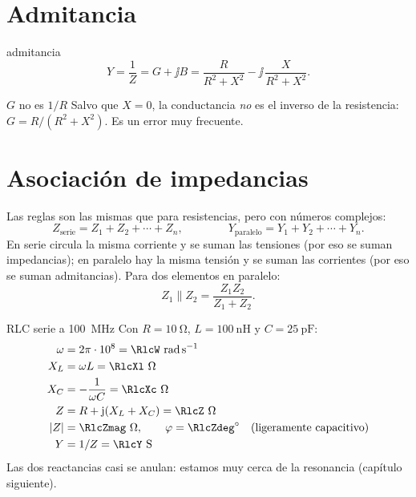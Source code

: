 \section{Admitancia}

\begin{definicion}{admitancia}
\begin{equation}
  Y = \frac{1}{Z} = G + \jj B = \frac{R}{R^2+X^2} - \jj\,\frac{X}{R^2+X^2}.
\end{equation}
\begin{donde}
\end{donde}
\end{definicion}
\begin{atencion}{$G$ no es $1/R$}
Salvo que $X = 0$, la conductancia \emph{no} es el inverso de la resistencia: $G = R/(R^2+X^2)$. Es un error muy frecuente.
\end{atencion}

\section{Asociación de impedancias}

Las reglas son las mismas que para resistencias, pero con números complejos:
\begin{equation}
  Z_{\text{serie}} = Z_1 + Z_2 + \cdots + Z_n , \qquad\qquad Y_{\text{paralelo}} = Y_1 + Y_2 + \cdots + Y_n .
\end{equation}
En serie circula la misma corriente y se suman las tensiones (por eso se suman impedancias); en paralelo hay la misma tensión y
se suman las corrientes (por eso se suman admitancias). Para dos elementos en paralelo:
\begin{equation}
  Z_1 \parallel Z_2 = \frac{Z_1 Z_2}{Z_1 + Z_2}.
\end{equation}

\begin{ejemplo}{RLC serie a \SI{100}{\mega\hertz}}
Con $R = \SI{10}{\ohm}$, $L = \SI{100}{\nano\henry}$ y $C = \SI{25}{\pico\farad}$:
\begin{align*}
  \omega &= 2\pi\cdot 10^{8} = \RlcW~\si{\radian\per\second}\\
  X_L &= \omega L = \RlcXl~\si{\ohm} \\
  X_C &= -\frac{1}{\omega C} = \RlcXc~\si{\ohm}\\
  Z &= R + \jj(X_L + X_C) = \RlcZ~\si{\ohm}\\
  \abs{Z} &= \RlcZmag~\si{\ohm}, \qquad \varphi = \RlcZdeg^\circ \quad(\text{ligeramente capacitivo})\\
  Y &= 1/Z = \RlcY~\si{\siemens}
\end{align*}
Las dos reactancias casi se anulan: estamos muy cerca de la resonancia (capítulo siguiente).
\end{ejemplo}


